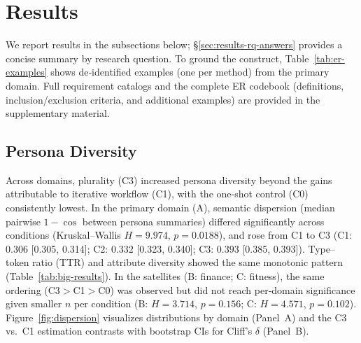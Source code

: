 \documentclass[acmsmall]{acmart}
\begin{document}
\section{Results}
\noindent We report results in the subsections below; \S\ref{sec:results-rq-answers} provides a concise summary by research question. To ground the construct, Table~\ref{tab:er-examples} shows de‑identified examples (one per method) from the primary domain. Full requirement catalogs and the complete ER codebook (definitions, inclusion/exclusion criteria, and additional examples) are provided in the supplementary material.

\subsection{Persona Diversity}
Across domains, plurality (C3) increased persona diversity beyond the gains attributable to iterative workflow (C1), with the one‑shot control (C0) consistently lowest. In the primary domain (A), semantic dispersion (median pairwise $1-\cos$ between persona summaries) differed significantly across conditions (Kruskal–Wallis $H{=}9.974$, $p{=}0.0188$), and rose from C1 to C3 (C1: $0.306$ [0.305, 0.314]; C2: $0.332$ [0.323, 0.340]; C3: $0.393$ [0.385, 0.393]). Type–token ratio (TTR) and attribute diversity showed the same monotonic pattern (Table~\ref{tab:big-results}). In the satellites (B: finance; C: fitness), the same ordering (C3$>$C1$>$C0) was observed but did not reach per‑domain significance given smaller $n$ per condition (B: $H{=}3.714$, $p{=}0.156$; C: $H{=}4.571$, $p{=}0.102$). Figure~\ref{fig:dispersion} visualizes distributions by domain (Panel A) and the C3 vs.\ C1 estimation contrasts with bootstrap CIs for Cliff’s $\delta$ (Panel B).
\end{document}
